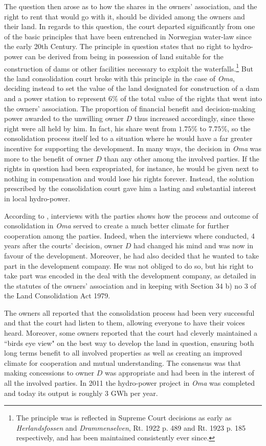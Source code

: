 The question then arose as to how the shares in the owners' association, and the right to rent that would go with it, should be divided among the owners and their land. In regards to this question, the court departed significantly from one of the basic principles that have been entrenched in Norwegian water-law since the early 20th Century. The principle in question states that no right to hydro-power can be derived from being in possession of land suitable for the construction of dams or other facilities necessary to exploit the waterfalls.\footnote{The principle was is reflected in Supreme Court decisions as early as \emph{Herlandsfossen} and \emph{Drammenselven}, Rt. 1922 p. 489 and Rt. 1923 p. 185 respectively, and has been maintained consistently ever since.} But the land consolidation court broke with this principle in the case of \emph{Oma}, deciding instead to set the value of the land designated for construction of a dam and a power station to represent $6 \%$ of the total value of the rights that went into the owners' association. The proportion of financial benefit and decision-making power awarded to the unwilling owner $D$ thus increased accordingly, since these right were all held by him. In fact, his share went from $1.75 \%$ to $7.75 \%$, so the consolidation process itself led to a situation where he would have a far greater incentive for supporting the development. In many ways, the decision in \emph{Oma} was more to the benefit of owner $D$ than any other among the involved parties. If the rights in question had been expropriated, for instance, he would be given next to nothing in compensation and would lose his rights forever. Instead, the solution prescribed by the consolidation court gave him a lasting and substantial interest in local hydro-power.

According to \cite{stokstad11}, interviews with the parties shows how the process and outcome of consolidation in \emph{Oma} served to create a much better climate for further cooperation among the parties. Indeed, when the interviews where conducted, 4 years after the courts' decision, owner $D$ had changed his mind and was now in favour of the development. Moreover, he had also decided that he wanted to take part in the development company. He was not obliged to do so, but his right to take part was encoded in the deal with the development company, as detailed in the statutes of the owners' association and in keeping with Section 34 b) no 3 of the Land Consolidation Act 1979.

The owners all reported that the consolidation process had been very successful and that the court had listen to them, allowing everyone to have their voices heard. Moreover, some owners reported that the court had cleverly maintained a ``birds eye view" on the best way to develop the land in question, ensuring both long terms benefit to all involved properties as well as creating an improved climate for cooperation and mutual understanding. The consensus was that making concessions to owner $D$ was appropriate and had been in the interest of all the involved parties. In 2011 the hydro-power project in \emph{Oma} was completed and today its output is roughly 3 GWh per year.

